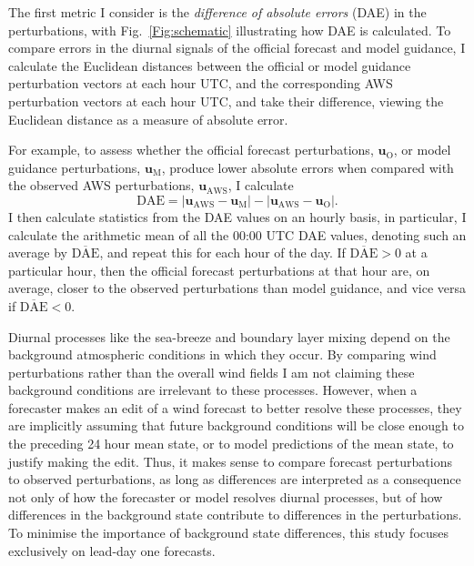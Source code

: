 \documentclass{ametsoc}
\begin{document}
The first metric I consider is the \textit{difference of absolute errors} (DAE) in the perturbations, with Fig.~\ref{Fig:schematic} illustrating how DAE is calculated. To compare errors in the diurnal signals of the official forecast and model guidance, I calculate the Euclidean distances between the official or model guidance perturbation vectors at each hour UTC, and the corresponding AWS perturbation vectors at each hour UTC, and take their difference, viewing the Euclidean distance as a measure of absolute error.

For example, to assess whether the official forecast perturbations, $\mathbf{u}_{\text{O}}$, or model guidance perturbations, $\mathbf{u}_{\text{M}}$, produce lower absolute errors when compared with the observed AWS perturbations, $\mathbf{u}_{\text{AWS}}$, I calculate 
\begin{equation}
\text{DAE} = \left\lvert \mathbf{u}_{\text{AWS}}-\mathbf{u}_{\text{M}} \right\rvert - \left\lvert \mathbf{u}_{\text{AWS}}-\mathbf{u}_{\text{O}} \right\rvert. \label{Eq:DAE}
\end{equation} 
I then calculate statistics from the DAE values on an hourly basis, in particular, I calculate the arithmetic mean of all the 00:00 UTC DAE values, denoting such an average by $\overline{\text{DAE}}$, and repeat this for each hour of the day. If $\overline{\text{DAE}}>0$ at a particular hour, then the official forecast perturbations at that hour are, on average, closer to the observed perturbations than model guidance, and vice versa if $\overline{\text{DAE}}<0$.

Diurnal processes like the sea-breeze and boundary layer mixing depend on the background atmospheric conditions in which they occur. By comparing wind perturbations rather than the overall wind fields I am not claiming these background conditions are irrelevant to these processes. However, when a forecaster makes an edit of a wind forecast to better resolve these processes, they are implicitly assuming that future background conditions will be close enough to the preceding 24 hour mean state, or to model predictions of the mean state, to justify making the edit. Thus, it makes sense to compare forecast perturbations to observed perturbations, as long as differences are interpreted as a consequence not only of how the forecaster or model resolves diurnal processes, but of how differences in the background state contribute to differences in the perturbations. To minimise the importance of background state differences, this study focuses exclusively on lead-day one forecasts.
\end{document}
